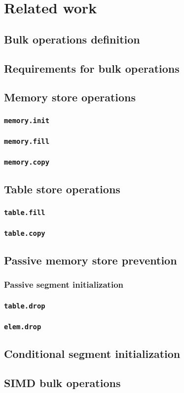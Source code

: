 \chapter{Related work}

\section{Bulk operations definition}
\section{Requirements for bulk operations}

\section{Memory store operations}
\subsection{\texttt{memory.init}}
\subsection{\texttt{memory.fill}}
\subsection{\texttt{memory.copy}}

\section{Table store operations}
\subsection{\texttt{table.fill}}
\subsection{\texttt{table.copy}}

\section{Passive memory store prevention}
\subsection{Passive segment initialization}
\subsection{\texttt{table.drop}}
\subsection{\texttt{elem.drop}}

\section{Conditional segment initialization}

\section{SIMD bulk operations}